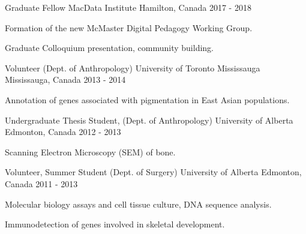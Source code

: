 \begin{cventries}
    \cventry
        {Graduate Fellow} %
        {MacData Institute} %
        {Hamilton, Canada} %
        {2017 - 2018} %
        {
        \begin{cvitems} %
            \item {Formation of the new McMaster Digital Pedagogy Working Group.}
			\item {Graduate Colloquium presentation, community building.}
        \end{cvitems}
        }

    \cventry
        {Volunteer (Dept. of Anthropology)} %
        {University of Toronto Mississauga} %
        {Mississauga, Canada} %
        {2013 - 2014} %
        {
        \begin{cvitems} %
            \item {Annotation of genes associated with pigmentation in East Asian populations.}
        \end{cvitems}
        }

    \cventry
        {Undergraduate Thesis Student, (Dept. of Anthropology)} %
        {University of Alberta} %
        {Edmonton, Canada} %
        {2012 - 2013} %
        {
        \begin{cvitems} %
            \item {Scanning Electron Microscopy (SEM) of bone.}
        \end{cvitems}
        }

    \cventry
        {Volunteer, Summer Student (Dept. of Surgery)} %
        {University of Alberta} %
        {Edmonton, Canada} %
        {2011 - 2013} %
        {
        \begin{cvitems} %
            \item {Molecular biology assays and cell tissue culture, DNA sequence analysis.}
			\item {Immunodetection of genes involved in skeletal development.}
        \end{cvitems}
        }

\end{cventries}    

